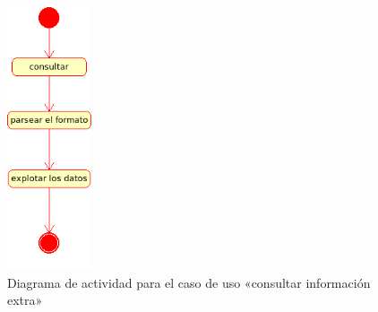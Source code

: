 \begin{figure}[H]
 	\centering
	\includegraphics[width=2.5cm]{images/uml/casos-uso/consultar-extra.png}
	\caption{Diagrama de actividad para el caso de uso «consultar información extra»}
	\label{fig:uml:consultar-extra}
\end{figure}

